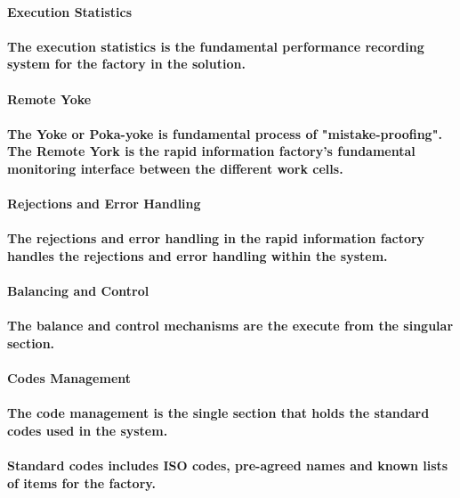 \documentclass{acm_proc_article-sp}
\begin{document}
\paragraph{\textbf{Execution Statistics}}
\paragraph{The execution statistics is the fundamental performance recording system for the factory in the solution.}
\paragraph{\textbf{Remote Yoke}}
\paragraph{The Yoke or Poka-yoke is fundamental process of "mistake-proofing". The Remote York is the rapid information factory's fundamental monitoring interface between the different work cells. }
\paragraph{\textbf{Rejections and Error Handling}}
\paragraph{The rejections and error handling in the rapid information factory handles the rejections and error handling within the system.}
\paragraph{Balancing and Control}
\paragraph{The balance and control mechanisms are the execute from the singular section.}
\paragraph{Codes Management}
\paragraph{The code management is the single section that holds the standard codes used in the system.}
\paragraph{Standard codes includes ISO codes, pre-agreed names and known lists of items for the factory.}
\end{document}
